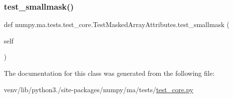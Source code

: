 \mbox{\label{classnumpy_1_1ma_1_1tests_1_1test__core_1_1TestMaskedArrayAttributes_a46b05008e70e192b9318e6b7997e6b0c}} 
\subsubsection{\texorpdfstring{test\+\_\+smallmask()}{test\_smallmask()}}
{\footnotesize\ttfamily def numpy.\+ma.\+tests.\+test\+\_\+core.\+Test\+Masked\+Array\+Attributes.\+test\+\_\+smallmask (\begin{DoxyParamCaption}\item[{}]{self }\end{DoxyParamCaption})}



The documentation for this class was generated from the following file\+:\begin{DoxyCompactItemize}
\item 
venv/lib/python3./site-\/packages/numpy/ma/tests/\hyperlink{numpy_2ma_2tests_2test__core_8py}{test\+\_\+core.\+py}\end{DoxyCompactItemize}
